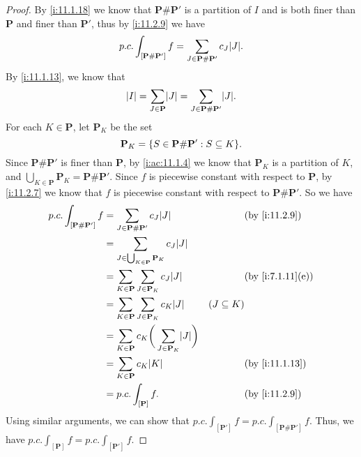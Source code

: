 \begin{proof}
  By \cref{i:11.1.18} we know that \(\mathbf{P} \# \mathbf{P}'\) is a partition of \(I\) and is both finer than \(\mathbf{P}\) and finer than \(\mathbf{P}'\), thus by \cref{i:11.2.9} we have
  \[
    p.c. \int_{[\mathbf{P} \# \mathbf{P}']} f = \sum_{J \in \mathbf{P} \# \mathbf{P}'} c_J \abs{J}.
  \]
  By \cref{i:11.1.13}, we know that
  \[
    \abs{I} = \sum_{J \in \mathbf{P}} \abs{J} = \sum_{J \in \mathbf{P} \# \mathbf{P}'} \abs{J}.
  \]
  For each \(K \in \mathbf{P}\), let \(\mathbf{P}_K\) be the set
  \[
    \mathbf{P}_K = \set{S \in \mathbf{P} \# \mathbf{P}' : S \subseteq K}.
  \]
  Since \(\mathbf{P} \# \mathbf{P}'\) is finer than \(\mathbf{P}\), by \cref{i:ac:11.1.4} we know that \(\mathbf{P}_K\) is a partition of \(K\), and \(\bigcup_{K \in \mathbf{P}} \mathbf{P}_K = \mathbf{P} \# \mathbf{P}'\).
  Since \(f\) is piecewise constant with respect to \(\mathbf{P}\), by \cref{i:11.2.7} we know that \(f\) is piecewise constant with respect to \(\mathbf{P} \# \mathbf{P}'\).
  So we have
  \begin{align*}
    p.c. \int_{[\mathbf{P} \# \mathbf{P}']} f & = \sum_{J \in \mathbf{P} \# \mathbf{P}'} c_J \abs{J}                        &                 & \by{i:11.2.9}    \\
                                              & = \sum_{J \in \bigcup_{K \in \mathbf{P}} \mathbf{P}_K} c_J \abs{J}                                               \\
                                              & = \sum_{K \in \mathbf{P}} \sum_{J \in \mathbf{P}_K} c_J \abs{J}             &                 & \by{i:7.1.11}[e] \\
                                              & = \sum_{K \in \mathbf{P}} \sum_{J \in \mathbf{P}_K} c_K \abs{J}             & (J \subseteq K)                    \\
                                              & = \sum_{K \in \mathbf{P}} c_K \bigg(\sum_{J \in \mathbf{P}_K} \abs{J}\bigg)                                      \\
                                              & = \sum_{K \in \mathbf{P}} c_K \abs{K}                                       &                 & \by{i:11.1.13}   \\
                                              & = p.c. \int_{[\mathbf{P}]} f.                                               &                 & \by{i:11.2.9}
  \end{align*}
  Using similar arguments, we can show that \(p.c. \int_{[\mathbf{P}']} f = p.c. \int_{[\mathbf{P} \# \mathbf{P}']} f\).
  Thus, we have \(p.c. \int_{[\mathbf{P}]} f = p.c. \int_{[\mathbf{P}']} f\).
\end{proof}

